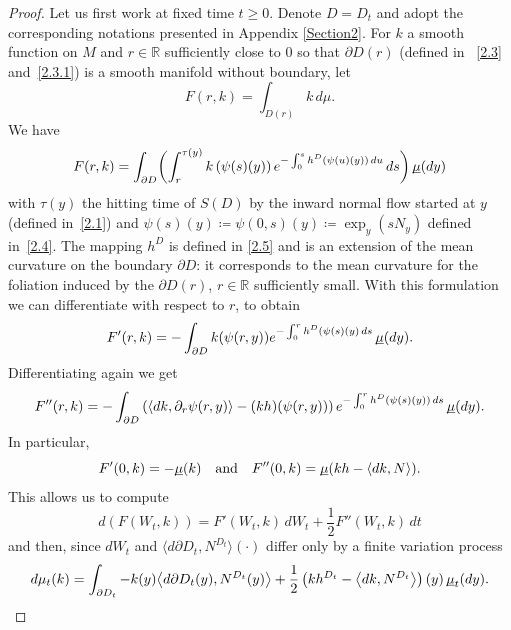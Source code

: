 \documentclass[10pt]{amsart}
\theoremstyle{plain}
\theoremstyle{definition}
\newcommand{\RR}{{\mathbb R}}
\newcommand\df{\coloneqq}
\newcommand{\usm}{{\underline{\smash{\mu}}}}
\let\f\frac
\let\pa\partial
\begin{document}
\begin{proof}
Let us first work at fixed time $t\geq 0$. Denote $D=D_t$ and adopt the corresponding notations presented in Appendix \ref{Section2}.
For $k$ a smooth function on $M$ and $r\in \RR$ sufficiently close to $0$ so that $\partial D(r)$ (defined in ~\eqref{2.3} and~\eqref{2.3.1}) is a smooth manifold without boundary, let
\begin{equation}
F(r,k)=\int_{D(r)}k\,d\mu.
\end{equation}
We have
\begin{equation}%
F(r,k)=\int_{\partial D}\biggl(\int_r^{\tau(y)}k\left(\psi(s)(y)\right)e^{-\int_0^sh^{{D}}(\psi(u)(y))\,du}{\, ds}\biggr)\,\usm(dy)
\end{equation}
with $\tau(y)$ the hitting time of $S(D)$ by the inward normal flow started at $y$ (defined in~\eqref{2.1}) and $\psi(s)(y)\df\psi(0,s)(y)\df\exp_y(sN_y)$ defined in~\eqref{2.4}.
The mapping $h^D$ is defined in \eqref{2.5} and is an extension of the mean curvature on the boundary $\pa D$: it corresponds to the mean curvature for the foliation induced by the $\pa D(r)$, $r\in\RR$ sufficiently small.
With this formulation we can differentiate with respect to $r$, to obtain
\begin{equation}
F'(r,k)=-\int_{\partial D} k(\psi(r,y))e^{-\int_0^rh^{{D}}(\psi(s)(y)\,ds}\,\usm(dy).
\end{equation}
Differentiating again we get
\begin{equation}
F''(r,k)=-\int_{\partial D}\left( \langle dk,\partial_r\psi(r,y)\rangle - (kh)(\psi(r,y))\right)e^{-\int_0^rh^{{D}}(\psi(s)(y))\,ds}\,\usm(dy).
\end{equation}
In particular,
\begin{equation}
F'(0,k)=-\usm(k)\quad\hbox{and}\quad F''(0,k)=\usm(kh-\langle dk,N\rangle).
\end{equation}
This allows us to compute
\begin{equation}
d(F(W_t,k))=F'(W_t,k)\,dW_t+\f12 F''(W_t,k)\, dt
\end{equation}
and then, since $dW_t$ and $\langle d\partial D_t, N^{D_t}\rangle(\cdot)$ differ only by a finite variation process
\begin{equation}
d\mu_t(k)=\int_{\partial D_t}-{k}(y)\bigl\langle d\partial D_t(y),N^{D_t}(y)\bigr\rangle +\f12 \left(kh^{{D_t}}-\bigl\langle dk,N^{D_t}\bigr\rangle\right)(y)\,\usm_{{t}}(dy).
\end{equation}

\end{proof}
\end{document}
